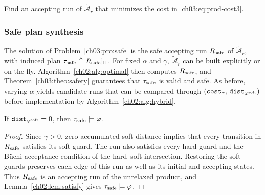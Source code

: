 \begin{problem}\label{ch03:pro:safe}
Find an accepting run of $\tilde{\mathcal{A}}_{r}$ that minimizes the cost in
\eqref{ch03:eq:prod-cost3}.
\end{problem}

\subsubsection{Safe plan synthesis}\label{ch03:subsec:safe-plan-synthesis}

The solution of Problem~\ref{ch03:pro:safe} is the safe accepting run
$R_{\textup{safe}}$ of $\tilde{\mathcal{A}}_{r}$, with induced plan
$\tau_{\textup{safe}} \triangleq R_{\textup{safe}}|_{\Pi}$. For fixed
$\alpha$ and $\gamma$, $\tilde{\mathcal{A}}_{r}$ can be built explicitly or on
the fly. Algorithm~\ref{ch02:alg:optimal} then computes
$R_{\textup{safe}}$, and Theorem~\ref{ch03:theo:safety} guarantees that
$\tau_{\textup{safe}}$ is valid and safe. As before, varying $\alpha$ yields
candidate runs that can be compared through
$(\texttt{cost}_{\tau},\, \texttt{dist}_{\varphi^{\textup{soft}}})$ before
implementation by Algorithm~\ref{ch02:alg:hybrid}.

\begin{lemma}\label{ch03:lem:distanceProofsafe}
If $\textup{\texttt{dist}}_{\varphi^{\textup{soft}}} = 0$, then
$\tau_{\textup{safe}} \models \varphi$.
\end{lemma}

\begin{revision}
\begin{proof}
Since $\gamma>0$, zero accumulated soft distance implies that every
transition in $R_{\textup{safe}}$ satisfies its soft guard. The run
also satisfies every hard guard and the B\"uchi acceptance condition
of the hard--soft intersection. Restoring the soft guards preserves
each edge of this run as well as its initial and accepting states.
Thus $R_{\textup{safe}}$ is an accepting run of the unrelaxed product,
and Lemma~\ref{ch02:lem:satisfy} gives $\tau_{\textup{safe}}\models\varphi$.
\end{proof}
\end{revision}














\endgroup
